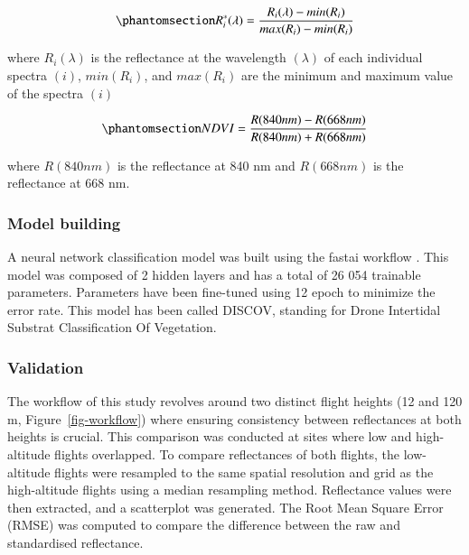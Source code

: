 \documentclass[
  number]{elsarticle}
\begin{document}
\begin{equation}\phantomsection\label{eq-std}{
R_{i}^{*}(\lambda) = \frac{R_{i}(\lambda) - min(R_{i})}{max(R_{i})- min(R_{i})}
}\end{equation}

where \(R_{i}(\lambda)\) is the reflectance at the wavelength
\((\lambda)\) of each individual spectra \((i)\), \(min(R_{i})\), and
\(max(R_{i})\) are the minimum and maximum value of the spectra \((i)\)

\begin{equation}\phantomsection\label{eq-ndvi}{
NDVI = \frac{R(840nm)-R(668nm)}{R(840nm)+R(668nm)}
}\end{equation}

where \(R(840nm)\) is the reflectance at 840 nm and \(R(668nm)\) is the
reflectance at 668 nm.

\subsubsection{Model building}\label{model-building}

A neural network classification model was built using the fastai
workflow \citep{howard2018fastai}. This model was composed of 2 hidden
layers and has a total of 26 054 trainable parameters. Parameters have
been fine-tuned using 12 epoch to minimize the error rate. This model
has been called DISCOV, standing for Drone Intertidal Substrat
Classification Of Vegetation.

\subsubsection{Validation}\label{validation}

The workflow of this study revolves around two distinct flight heights
(12 and 120 m, Figure~\ref{fig-workflow}) where ensuring consistency
between reflectances at both heights is crucial. This comparison was
conducted at sites where low and high-altitude flights overlapped. To
compare reflectances of both flights, the low-altitude flights were
resampled to the same spatial resolution and grid as the high-altitude
flights using a median resampling method. Reflectance values were then
extracted, and a scatterplot was generated. The Root Mean Square Error
(RMSE) was computed to compare the difference between the raw and
standardised reflectance.
\end{document}
